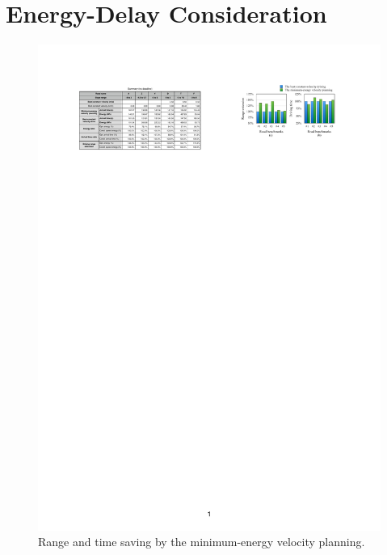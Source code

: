 \documentclass{IEEEtran}
\begin{document}
\section{Energy-Delay Consideration} \label{sec:ed_consideration}
\begin{figure}	 %
\includegraphics[width=1.0\hsize]{Figures/no_deadline_bar.pdf}
\caption{Range and time saving by the minimum-energy velocity planning.}
\label{fig:no_deadline_bar}
\end{figure} 
\end{document}
